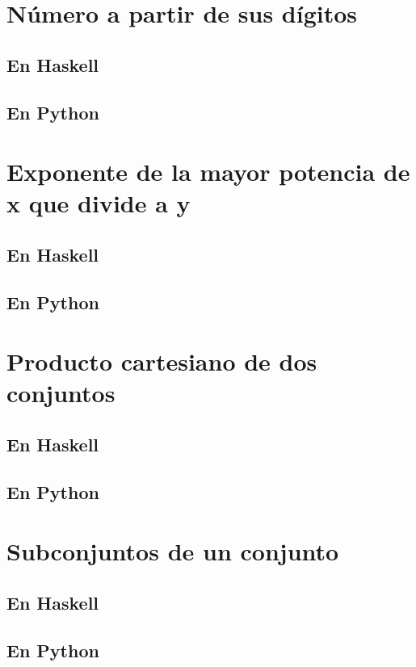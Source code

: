 \documentclass[a4paper,12pt,twoside]{book}
\begin{document}
\section{Número a partir de sus dígitos}
\subsection*{En Haskell}
\subsection*{En Python}

\section{Exponente de la mayor potencia de x que divide a y}
\subsection*{En Haskell}
\subsection*{En Python}

\section{Producto cartesiano de dos conjuntos}
\subsection*{En Haskell}
\subsection*{En Python}

\section{Subconjuntos de un conjunto}
\subsection*{En Haskell}
\subsection*{En Python}
\end{document}

